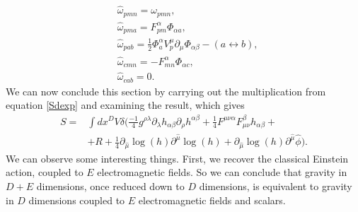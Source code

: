 \documentclass{article}
\begin{document}
\begin{subequations}
\begin{align}
&\hat\omega_{pmn} = \omega_{pmn},\\
&\hat \omega_{pma} = F^{\alpha}_{pm}\Phi_{\alpha a},\\
&\hat\omega_{pab} = \frac{1}{2}\Phi^\alpha_aV^\mu_p\partial_\mu\Phi_{\alpha \beta} - (a \leftrightarrow b),\\
&\hat\omega_{cmn} = - F^{\alpha}_{mn}\Phi_{\alpha c},\\
&\hat \omega_{cab}  = 0.
\end{align}
\end{subequations}
We can now conclude this section by carrying out the multiplication from equation \eqref{Sdexp} and examining the result, which gives
\begin{equation}
    \boxed{
    \begin{aligned}
    S = &\int d x^D  V \delta \Big( 
    \frac{-1}{4} g^{\rho \lambda} \partial_\lambda h_{\alpha \beta}\partial_\rho h^{\alpha \beta}
    +\frac{1}{4}F^{\mu \nu \alpha}F^{\beta}_{\mu  \nu}h_{\alpha \beta}+\\
    &+ R + \frac{1}{4} \partial_{\hat \mu} \log(h) \partial^{\hat \mu} \log(h) + \partial_{\hat \mu} \log(h) \partial^{\hat \mu} \hat \phi \Big).
\end{aligned}}
\end{equation}
We can observe some interesting things. First, we recover the classical Einstein action, coupled to $E$ electromagnetic fields. So we can conclude that gravity in $D + E $ dimensions, once reduced down to $D$ dimensions, is equivalent to gravity in $D$ dimensions coupled to $E$ electromagnetic fields and scalars.
\end{document}
